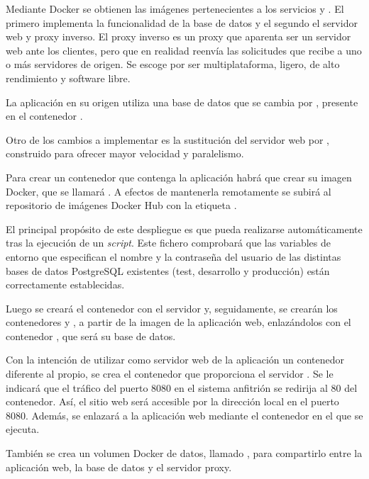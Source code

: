 Mediante Docker se obtienen las imágenes pertenecientes a los servicios  y . El primero implementa la funcionalidad de la base de datos y el segundo el servidor web y proxy inverso. El proxy inverso es un proxy que aparenta ser un servidor web ante los clientes, pero que en realidad reenvía las solicitudes que recibe a uno o más servidores de origen. Se escoge  por ser multiplataforma, ligero, de alto rendimiento y software libre.

La aplicación en su origen utiliza una base de datos  que se cambia por , presente en el contenedor . 

Otro de los cambios a implementar es la sustitución del servidor web  por , construido para ofrecer mayor velocidad y paralelismo.

Para crear un contenedor que contenga la aplicación habrá que crear su imagen Docker, que se llamará . A efectos de mantenerla remotamente se subirá al repositorio de imágenes Docker Hub con la etiqueta .

El principal propósito de este despliegue es que pueda realizarse automáticamente tras la ejecución de un \textit{script}. Este fichero comprobará que las variables de entorno que especifican el nombre y la contraseña del usuario de las distintas bases de datos PostgreSQL existentes (test, desarrollo y producción) están correctamente establecidas.

Luego se creará el contenedor  con el servidor  y, seguidamente, se crearán los contenedores  y , a partir de la imagen de la aplicación web, enlazándolos con el contenedor , que será su base de datos.

Con la intención de utilizar como servidor web de la aplicación un contenedor diferente al propio, se crea el contenedor  que proporciona el servidor . Se le indicará que el tráfico del puerto 8080 en el sistema anfitrión se redirija al 80 del contenedor. Así, el sitio web será accesible por la dirección local en el puerto 8080. Además, se enlazará a la aplicación web mediante el contenedor en el que se ejecuta.

También se crea un volumen Docker de datos, llamado , para compartirlo entre la aplicación web, la base de datos y el servidor proxy.

